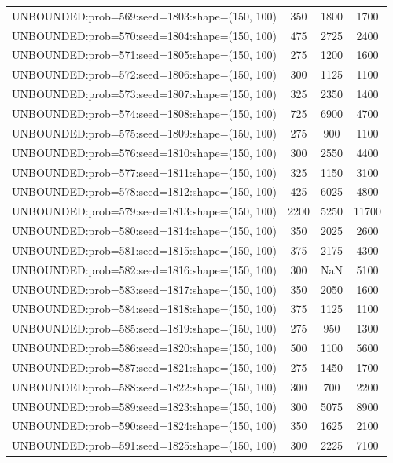 \begin{longtable}{lccc}
UNBOUNDED:prob=569:seed=1803:shape=(150, 100) &      350 &  1800 &   1700 \\
UNBOUNDED:prob=570:seed=1804:shape=(150, 100) &      475 &  2725 &   2400 \\
UNBOUNDED:prob=571:seed=1805:shape=(150, 100) &      275 &  1200 &   1600 \\
UNBOUNDED:prob=572:seed=1806:shape=(150, 100) &      300 &  1125 &   1100 \\
UNBOUNDED:prob=573:seed=1807:shape=(150, 100) &      325 &  2350 &   1400 \\
UNBOUNDED:prob=574:seed=1808:shape=(150, 100) &      725 &  6900 &   4700 \\
UNBOUNDED:prob=575:seed=1809:shape=(150, 100) &      275 &   900 &   1100 \\
UNBOUNDED:prob=576:seed=1810:shape=(150, 100) &      300 &  2550 &   4400 \\
UNBOUNDED:prob=577:seed=1811:shape=(150, 100) &      325 &  1150 &   3100 \\
UNBOUNDED:prob=578:seed=1812:shape=(150, 100) &      425 &  6025 &   4800 \\
UNBOUNDED:prob=579:seed=1813:shape=(150, 100) &     2200 &  5250 &  11700 \\
UNBOUNDED:prob=580:seed=1814:shape=(150, 100) &      350 &  2025 &   2600 \\
UNBOUNDED:prob=581:seed=1815:shape=(150, 100) &      375 &  2175 &   4300 \\
UNBOUNDED:prob=582:seed=1816:shape=(150, 100) &      300 &   NaN &   5100 \\
UNBOUNDED:prob=583:seed=1817:shape=(150, 100) &      350 &  2050 &   1600 \\
UNBOUNDED:prob=584:seed=1818:shape=(150, 100) &      375 &  1125 &   1100 \\
UNBOUNDED:prob=585:seed=1819:shape=(150, 100) &      275 &   950 &   1300 \\
UNBOUNDED:prob=586:seed=1820:shape=(150, 100) &      500 &  1100 &   5600 \\
UNBOUNDED:prob=587:seed=1821:shape=(150, 100) &      275 &  1450 &   1700 \\
UNBOUNDED:prob=588:seed=1822:shape=(150, 100) &      300 &   700 &   2200 \\
UNBOUNDED:prob=589:seed=1823:shape=(150, 100) &      300 &  5075 &   8900 \\
UNBOUNDED:prob=590:seed=1824:shape=(150, 100) &      350 &  1625 &   2100 \\
UNBOUNDED:prob=591:seed=1825:shape=(150, 100) &      300 &  2225 &   7100 \\

\end{longtable}
